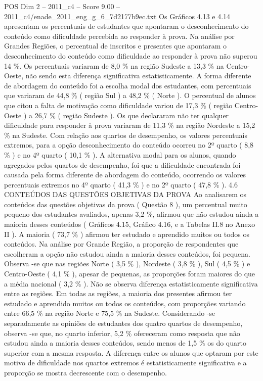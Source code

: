 \begin{textsample}{POS Dim 2 – 2011\_c4 – Score 9.00 – 2011\_c4/enade\_2011\_eng\_g\_6\_7d2177b9ec.txt}
Os Gráficos 4.13 e 4.14 apresentam os percentuais de estudantes que apontaram o desconhecimento do conteúdo como dificuldade percebida ao responder à prova.
Na análise por Grandes Regiões, o percentual de inscritos e presentes que apontaram o desconhecimento do conteúdo como dificuldade ao responder à prova não superou 14 \%.
Os percentuais variaram de 8,0 \% na região Sudeste a 13,3 \% na Centro-Oeste, não sendo esta diferença significativa estatisticamente.
A forma diferente de abordagem do conteúdo foi a escolha modal dos estudantes, com percentuais que variaram de 44,8 \% ( região Sul ) a 48,2 \% ( Norte ).
O percentual de alunos que citou a falta de motivação como dificuldade variou de 17,3 \% ( região Centro-Oeste ) a 26,7 \% ( região Sudeste ).
Os que declararam não ter qualquer dificuldade para responder à prova variaram de 11,3 \% na região Nordeste a 15,2 \% na Sudeste.
Com relação aos quartos de desempenho, os valores percentuais extremos, para a opção desconhecimento do conteúdo ocorreu no 2º quarto ( 8,8 \% ) e no 4º quarto ( 10,1 \% ).
A alternativa modal para os alunos, quando agregados pelos quartos de desempenho, foi que a dificuldade encontrada foi causada pela forma diferente de abordagem do conteúdo, ocorrendo os valores percentuais extremos no 4º quarto ( 41,3 \% ) e no 2º quarto ( 47,8 \% ). 4.6 CONTEÚDOS DAS QUESTÕES OBJETIVAS DA PROVA Ao analisarem os conteúdos das questões objetivas da prova ( Questão 8 ), um percentual muito pequeno dos estudantes avaliados, apenas 3,2 \%, afirmou que não estudou ainda a maioria desses conteúdos ( Gráficos 4.15, Gráfico 4.16, e a Tabelas II.8 no Anexo II ).
A maioria ( 73,7 \% ) afirmou ter estudado e aprendido muitos ou todos os conteúdos.
Na análise por Grande Região, a proporção de respondentes que escolheram a opção não estudou ainda a maioria desses conteúdos, foi pequena.
Observa -se que nas regiões Norte ( 3,5 \% ), Nordeste ( 3,8 \% ), Sul ( 4,5 \% ) e Centro-Oeste ( 4,1 \% ), apesar de pequenas, as proporções foram maiores do que a média nacional ( 3,2 \% ).
Não se observa diferença estatisticamente significativa entre as regiões.
Em todas as regiões, a maioria dos presentes afirmou ter estudado e aprendido muitos ou todos os conteúdos, com proporções variando entre 66,5 \% na região Norte e 75,5 \% na Sudeste.
Considerando -se separadamente as opiniões de estudantes dos quatro quartos de desempenho, observa -se que, no quarto inferior, 5,2 \% ofereceram como resposta que não estudou ainda a maioria desses conteúdos, sendo menos de 1,5 \% os do quarto superior com a mesma resposta.
A diferença entre os alunos que optaram por este motivo de dificuldade nos quartos extremos é estatisticamente significativa e a proporção se mostra decrescente com o desempenho.

\end{textsample}
